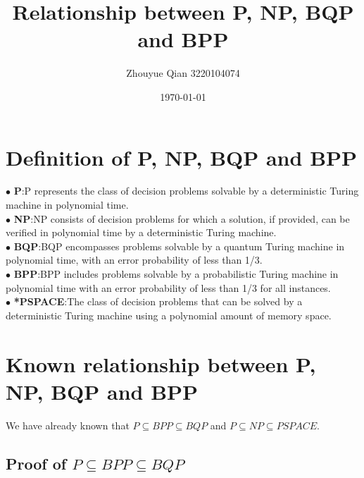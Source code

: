 \documentclass[a4paper]{article}
\title{Relationship between P, NP, BQP and BPP}
\author{Zhouyue Qian 3220104074}
\date{\today}
\begin{document}
\maketitle

\section{Definition of P, NP, BQP and BPP}
\noindent $\bullet$ \textbf{P}:P represents the class of decision problems solvable by a deterministic Turing machine in polynomial time.\\
\noindent $\bullet$ \textbf{NP}:NP consists of decision problems for which a solution, if provided, can be verified in polynomial time by a deterministic Turing machine. \\
\noindent $\bullet$ \textbf{BQP}:BQP encompasses problems solvable by a quantum Turing machine in polynomial time, with an error probability of less than 1/3.\\
\noindent $\bullet$ \textbf{BPP}:BPP includes problems solvable by a probabilistic Turing machine in polynomial time with an error probability of less than 1/3 for all instances.\\
\noindent $\bullet$ \textbf{*PSPACE}:The class of decision problems that can be solved by a deterministic Turing machine using a polynomial amount of memory space.
\section{Known relationship between P, NP, BQP and BPP}
We have already known that $P \subseteq BPP \subseteq BQP$ and $P \subseteq NP \subseteq PSPACE$.
\subsection{\textbf{Proof of $P \subseteq BPP \subseteq BQP$}}
\end{document}
